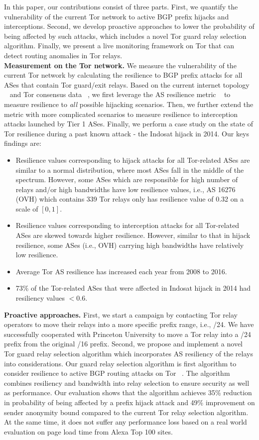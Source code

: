 In this paper, our contributions consist of three parts. First, we quantify the vulnerability of the current Tor network to active BGP prefix hijacks and interceptions. Second, we develop proactive approaches to lower the probability of being affected by such attacks, which includes a novel Tor guard relay selection algorithm. Finally, we present a live monitoring framework on Tor that can detect routing anomalies in Tor relays. 
\\
\textbf{Measurement on the Tor network.} We measure the vulnerability of the current Tor network by calculating the resilience to BGP prefix attacks for all ASes that contain Tor guard/exit relays. Based on the current internet topology ~\cite{topology} and Tor consensus data ~\cite{torconsensus}, we first leverage the AS resilience metric ~\cite{lad2007understanding} to measure resilience to \emph{all} possible hijacking scenarios. Then, we further extend the metric with more complicated scenarios to measure resilience to interception attacks launched by Tier 1 ASes. Finally, we perform a case study on the state of Tor resilience during a past known attack - the Indosat hijack in 2014. Our keys findings are:
\begin{itemize}
\item Resilience values corresponding to hijack attacks for all Tor-related ASes are similar to a normal distribution, where most ASes fall in the middle of the spectrum. However, some ASes which are responsible for high number of relays and/or high bandwidths have low resilience values, i.e., AS 16276 (OVH) which contains 339 Tor relays only has resilience value of 0.32 on a scale of $[0,1]$.
\item Resilience values corresponding to interception attacks for all Tor-related ASes are skewed towards higher resilience. However, similar to that in hijack resilience, some ASes (i.e., OVH) carrying high bandwidths have relatively low resilience. 
\item Average Tor AS resilience has increased each year from 2008 to 2016. 
\item 73\% of the Tor-related ASes that were affected in Indosat hijack in 2014 had resiliency values $< 0.6$.
\end{itemize}
\textbf{Proactive approaches.} First, we start a campaign by contacting Tor relay operators to move their relays into a more specific prefix range, i.e., /24. We have successfully cooperated with Princeton University to move a Tor relay into a /24 prefix from the original /16 prefix. Second, we propose and implement a novel Tor guard relay selection algorithm which incorporates AS resiliency of the relays into considerations. Our guard relay selection algorithm is first algorithm to consider resilience to active BGP routing attacks on Tor ~\cite{sun2015raptor}. The algorithm combines resiliency and bandwidth into relay selection to ensure security as well as performance. Our evaluation shows that the algorithm achieves 35\% reduction in probability of being affected by a prefix hijack attack and 49\% improvement on sender anonymity bound compared to the current Tor relay selection algorithm. At the same time, it does not suffer any performance loss based on a real world evaluation on page load time from Alexa Top 100 sites. 
